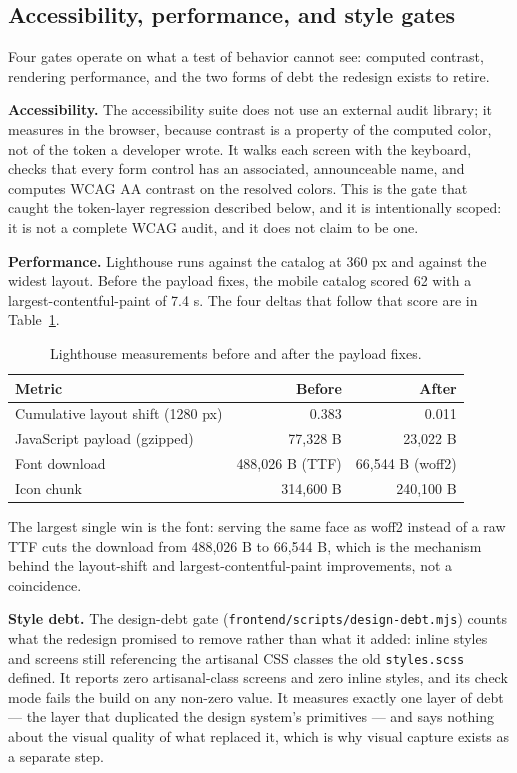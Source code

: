 \subsection{Accessibility, performance, and style gates}

Four gates operate on what a test of behavior cannot see: computed contrast, rendering performance,
and the two forms of debt the redesign exists to retire.

\textbf{Accessibility.} The accessibility suite does not use an external audit library; it measures
in the browser, because contrast is a property of the computed color, not of the token a developer
wrote. It walks each screen with the keyboard, checks that every form control has an associated,
announceable name, and computes WCAG AA contrast on the resolved colors. This is the gate that
caught the token-layer regression described below, and it is intentionally scoped: it is not a
complete WCAG audit, and it does not claim to be one.

\textbf{Performance.} Lighthouse runs against the catalog at 360 px and against the widest layout.
Before the payload fixes, the mobile catalog scored 62 with a largest-contentful-paint of 7.4 s.
The four deltas that follow that score are in Table~\ref{tab:lighthouse}.

\begin{table}[htbp]
  \centering
  \begin{tabular}{lrr}
    \hline
    Metric & Before & After \\
    \hline
    Cumulative layout shift (1280 px) & 0.383 & 0.011 \\
    JavaScript payload (gzipped) & 77,328 B & 23,022 B \\
    Font download & 488,026 B (TTF) & 66,544 B (woff2) \\
    Icon chunk & 314,600 B & 240,100 B \\
    \hline
  \end{tabular}
  \caption{Lighthouse measurements before and after the payload fixes.}
  \label{tab:lighthouse}
\end{table}

The largest single win is the font: serving the same face as woff2 instead of a raw TTF cuts the
download from 488,026 B to 66,544 B, which is the mechanism behind the layout-shift and
largest-contentful-paint improvements, not a coincidence.

\textbf{Style debt.} The design-debt gate (\verb|frontend/scripts/design-debt.mjs|) counts what the
redesign promised to remove rather than what it added: inline styles and screens still referencing
the artisanal CSS classes the old \verb|styles.scss| defined. It reports zero artisanal-class
screens and zero inline styles, and its check mode fails the build on any non-zero value. It
measures exactly one layer of debt — the layer that duplicated the design system's primitives — and
says nothing about the visual quality of what replaced it, which is why visual capture exists as a
separate step.

